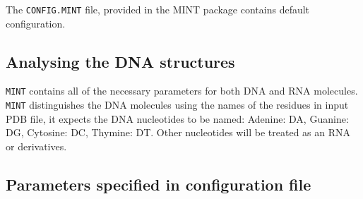 \documentclass[12pt]{article}
\begin{document}
The \texttt{CONFIG.MINT} file, provided in the MINT package contains default configuration. 

\subsection{Analysing the DNA structures}
{\tt MINT} contains all of the necessary parameters for both DNA and RNA molecules. {\tt MINT} distinguishes the DNA molecules using the names of the residues in input PDB file, it expects  the DNA nucleotides to be named: Adenine: DA, Guanine: DG, Cytosine: DC, Thymine: DT. Other nucleotides will be treated as an RNA or derivatives. 

\subsection{Parameters specified in configuration file}
\end{document}
